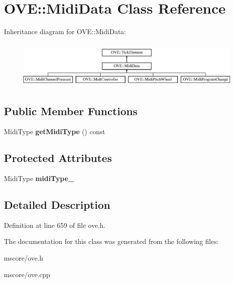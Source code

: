 \hypertarget{class_o_v_e_1_1_midi_data}{}\section{O\+VE\+:\+:Midi\+Data Class Reference}
\label{class_o_v_e_1_1_midi_data}
Inheritance diagram for O\+VE\+:\+:Midi\+Data\+:\begin{figure}[H]
\begin{center}
\leavevmode
\includegraphics[height=2.400000cm]{class_o_v_e_1_1_midi_data}
\end{center}
\end{figure}
\subsection*{Public Member Functions}
\begin{DoxyCompactItemize}
\item 
\mbox{\label{class_o_v_e_1_1_midi_data_ac5f1308a8c5dc8ad996c0548d36947fd}} 
Midi\+Type {\bfseries get\+Midi\+Type} () const
\end{DoxyCompactItemize}
\subsection*{Protected Attributes}
\begin{DoxyCompactItemize}
\item 
\mbox{\label{class_o_v_e_1_1_midi_data_ae3dcbba6990da6a0c2a5c8a8192df53f}} 
Midi\+Type {\bfseries midi\+Type\+\_\+}
\end{DoxyCompactItemize}


\subsection{Detailed Description}


Definition at line 659 of file ove.\+h.



The documentation for this class was generated from the following files\+:\begin{DoxyCompactItemize}
\item 
mscore/ove.\+h\item 
mscore/ove.\+cpp\end{DoxyCompactItemize}
